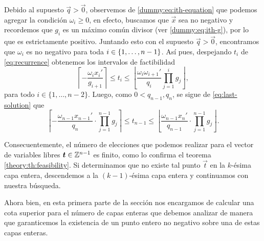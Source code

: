 Debido al supuesto $\vec{q} > \vec{0}$, observemos de \eqref{dummy:eq:ith-equation} que podemos
agregar la condición $\omega_{i} \geq 0$, en efecto, buscamos que $\vec{x}$ sea no negativo y
recordemos que $g_i$ es un máximo común divisor (ver \eqref{dummy:eq:ith-g}), por lo que es
estrictamente positivo. Juntando esto con el supuesto $\vec{q} > \vec{0}$, encontramos que
$\omega_i$ es no negativo para toda $i \in \lbrace 1, \ldots, n - 1 \rbrace$. Así pues, despejando $t_i$ de
\eqref{eq:recurrence} obtenemos los intervalos de factibilidad
\begin{equation*}
	\label{phase-1:finite:eq:param-bounds}
	\left\lceil -\frac{\omega_ix_i'}{g_{i+1}} \right\rceil
	\leq
	t_i
	\leq
	\left\lfloor \frac{\omega_i\omega_{i+1}'}{q_i} \prod_{j=1}^{i}g_j \right\rfloor,
\end{equation*}
para todo $i \in \lbrace 1, \ldots, n - 2\rbrace$. Luego, como $0 < q_{n - 1}, q_n$, se sigue de
\eqref{eq:last-solution} que
\begin{equation*}
	\label{phase-1:finite:eq:param-bounds-last}
	\left\lceil -\frac{\omega_{n-1}x_{n-1}'}{q_n} \cdot \prod_{j=1}^{n-1}g_j \right\rceil
	\leq
	t_{n - 1}
	\leq
	\left\lfloor \frac{\omega_{n-1}x_{n}'}{q_{n-1}} \cdot \prod_{j=1}^{n-1}g_j \right\rfloor.
\end{equation*}

Consecuentemente, el número de elecciones que podemos realizar para el vector
de variables libres $\boldsymbol{t} \in \mathbb{Z}^{n-1}$ es finito, como lo confirma el
teorema \ref{theory:th:feasibility}. Si determinamos que no existe tal punto
$\vec{t}$ en la $k$-ésima capa entera, descendemos a la $(k -1)$-ésima capa
entera y continuamos con nuestra búsqueda.


Ahora bien, en esta primera parte de la sección nos encargamos de calcular una cota superior para el
número de capas enteras que debemos analizar de manera que garanticemos la existencia de un punto
entero no negativo sobre una de estas capas enteras.


